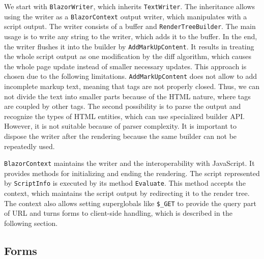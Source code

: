 We start with \texttt{BlazorWriter}, which inherits \texttt{TextWriter}.
The inheritance allows using the writer as a \texttt{BlazorContext} output writer, which manipulates with a script output.
The writer consists of a buffer and \texttt{RenderTreeBuilder}.
The main usage is to write any string to the writer, which adds it to the buffer.
In the end, the writer flushes it into the builder by \texttt{AddMarkUpContent}.
It results in treating the whole script output as one modification by the diff algorithm, which causes the whole page update instead of smaller necessary updates.
This approach is chosen due to the following limitations.
\texttt{AddMarkUpContent} does not allow to add incomplete markup text, meaning that tags are not properly closed.
Thus, we can not divide the text into smaller parts because of the HTML nature, where tags are coupled by other tags.
The second possibility is to parse the output and recognize the types of HTML entities, which can use specialized builder API.
However, it is not suitable because of parser complexity.
It is important to dispose the writer after the rendering because the same builder can not be repeatedly used.
\par
\texttt{BlazorContext} maintains the writer and the interoperability with JavaScript.
It provides methods for initializing and ending the rendering.
The script represented by \texttt{ScriptInfo} is executed by its method \texttt{Evaluate}. This method accepts the context, which maintains the script output by redirecting it to the render tree.
The context also allows setting superglobals like \texttt{\$\_GET} to provide the query part of URL and turns forms to client-side 
handling, which is described in the following section.

\subsection{Forms}

